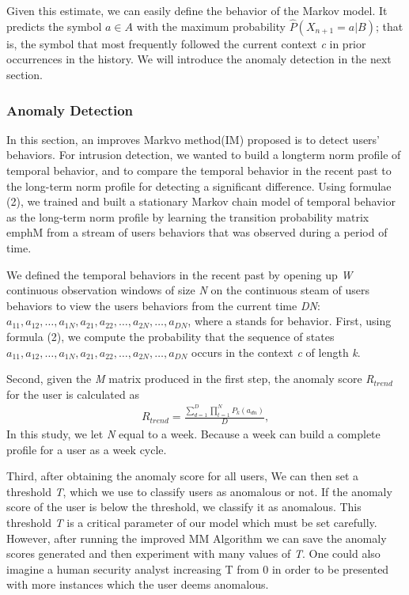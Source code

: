 \documentclass[conference]{IEEEtran}
\begin{document}
Given this estimate, we can easily define the behavior of the Markov model. It predicts the symbol \emph{$a \in A$} with the maximum probability \emph{$\hat P(X_{n+1}=a|B)$}; that is, the symbol that most frequently followed the current context \emph{c} in prior occurrences in the history. We will introduce the anomaly detection in the next section.


\subsubsection{Anomaly Detection}
In this section, an improves Markvo method(IM) proposed is to detect users' behaviors. For intrusion detection, we wanted to build a longterm norm profile of temporal behavior, and to
compare the temporal behavior in the recent past to the long-term norm profile for detecting a significant difference. Using formulae (2), we trained and built a stationary Markov chain model  of temporal behavior as the long-term norm profile by learning the transition probability matrix emph{M} from a stream of users behaviors that was observed during a period of time.

We defined the temporal behaviors in the recent past by opening up \emph{W} continuous observation windows of size \emph{N} on the continuous steam of users behaviors to view the users behaviors from the current time \emph{DN}:
\emph{$a_{11},a_{12},\dots,a_{1N},a_{21},a_{22},\dots,a_{2N},\dots,a_{DN}$}, where a stands for behavior. First, using formula (2), we compute the probability that the sequence of states \emph{$a_{11},a_{12},\dots,a_{1N},a_{21},a_{22},\dots,a_{2N},\dots,a_{DN}$} occurs in the context \emph{c} of length \emph{k}.

Second, given the \emph{M} matrix produced in the first step, the anomaly score \emph{R$_{trend}$} for the user is calculated as
\begin{align}
R_{trend}=\frac{\sum_{d=1}^D \prod_{t=1}^N P_k(a_{dn})}{D},
\end{align}
In this study, we let \emph{N} equal to a week. Because a week can build a complete profile for a user as a week cycle.

Third, after obtaining the anomaly score for all users, 
We can then set a threshold \emph{T}, which we use to classify users as anomalous or not. If the anomaly score of the user is below the threshold, we classify it as anomalous. This threshold \emph{T} is a critical parameter of our model which must be set carefully.
However, after running the improved MM Algorithm we can save the anomaly scores generated and then experiment with many values of \emph{T}. One could also imagine a human security analyst increasing T from 0 in order to be presented with more instances which the user deems anomalous.
\end{document}

